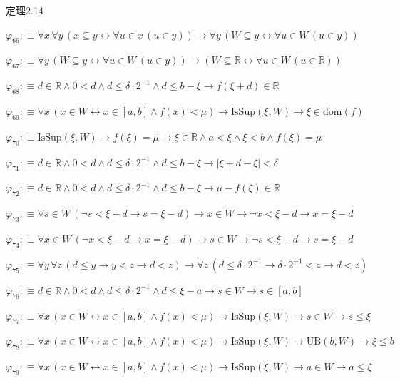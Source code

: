 \begin{fullproof}{定理2.14}
\begin{abbrevlist}
\item $\varphi_{66} :\equiv \forall x\,\forall y\,(x \subseteq y \leftrightarrow \forall u \in x\,(u \in y)) \to \forall y\,(W \subseteq y \leftrightarrow \forall u \in W\,(u \in y))$
\item $\varphi_{67} :\equiv \forall y\,(W \subseteq y \leftrightarrow \forall u \in W\,(u \in y)) \to (W \subseteq \mathbb{R} \leftrightarrow \forall u \in W\,(u \in \mathbb{R}))$
\item $\varphi_{68} :\equiv d \in \mathbb{R} \land 0 < d \land d \leq \delta \cdot 2^{-1} \land d \leq b - \xi \to f(\xi + d) \in \mathbb{R}$
\item $\varphi_{69} :\equiv \forall x\,(x \in W \leftrightarrow x \in [a,b] \land f(x) < \mu) \to \mathrm{IsSup}(\xi,W) \to \xi \in \mathrm{dom}(f)$
\item $\varphi_{70} :\equiv \mathrm{IsSup}(\xi,W) \to f(\xi) = \mu \to \xi \in \mathbb{R} \land a < \xi \land \xi < b \land f(\xi) = \mu$
\item $\varphi_{71} :\equiv d \in \mathbb{R} \land 0 < d \land d \leq \delta \cdot 2^{-1} \land d \leq b - \xi \to \lvert \xi + d - \xi \rvert < \delta$
\item $\varphi_{72} :\equiv d \in \mathbb{R} \land 0 < d \land d \leq \delta \cdot 2^{-1} \land d \leq b - \xi \to \mu - f(\xi) \in \mathbb{R}$
\item $\varphi_{73} :\equiv \forall s \in W\,(\neg s < \xi - d \to s = \xi - d) \to x \in W \to \neg x < \xi - d \to x = \xi - d$
\item $\varphi_{74} :\equiv \forall x \in W\,(\neg x < \xi - d \to x = \xi - d) \to s \in W \to \neg s < \xi - d \to s = \xi - d$
\item $\varphi_{75} :\equiv \forall y\,\forall z\,(d \leq y \to y < z \to d < z) \to \forall z\,(d \leq \delta \cdot 2^{-1} \to \delta \cdot 2^{-1} < z \to d < z)$
\item $\varphi_{76} :\equiv d \in \mathbb{R} \land 0 < d \land d \leq \delta \cdot 2^{-1} \land d \leq \xi - a \to s \in W \to s \in [a,b]$
\item $\varphi_{77} :\equiv \forall x\,(x \in W \leftrightarrow x \in [a,b] \land f(x) < \mu) \to \mathrm{IsSup}(\xi,W) \to s \in W \to s \leq \xi$
\item $\varphi_{78} :\equiv \forall x\,(x \in W \leftrightarrow x \in [a,b] \land f(x) < \mu) \to \mathrm{IsSup}(\xi,W) \to \mathrm{UB}(b,W) \to \xi \leq b$
\item $\varphi_{79} :\equiv \forall x\,(x \in W \leftrightarrow x \in [a,b] \land f(x) < \mu) \to \mathrm{IsSup}(\xi,W) \to a \in W \to a \leq \xi$

\end{abbrevlist}
\end{fullproof}
